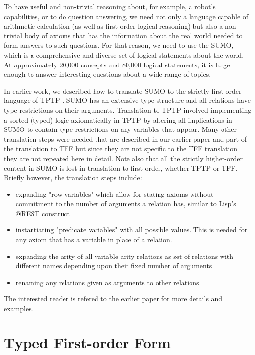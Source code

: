 \documentclass{article}
\begin{document}
To have useful and non-trivial reasoning about, for example, a robot's
capabilities, or to do question answering, we need not only a language capable of
arithmetic calculation (as well as first order logical reasoning) but also a
non-trivial body of axioms that has the information about the real world needed
to form answers to such questions.  For that reason, we need to use the SUMO,
which is a comprehensive and diverse set of logical statements about the world.
At approximately 20,000 concepts and 80,000 logical statements, it is large
enough to answer interesting questions about a wide range of topics.

In earlier work, we described \citep{ps14} how to translate SUMO to the strictly
first order language of TPTP \citep{Sutcliffe:2007:TTC:2391910.2391914}.  SUMO
has an extensive type structure and all relations have type restrictions on
their arguments.  Translation to TPTP involved implementing a sorted (typed)
logic axiomatically in TPTP by altering all implications in SUMO to contain type
restrictions on any variables that appear.  Many other translation steps were
needed that are described in our earlier paper and part of the translation to
TFF but since they are not specific to the TFF translation they are not repeated
here in detail. Note also that all the strictly higher-order content in SUMO is
lost in translation to first-order, whether TPTP or TFF. Briefly however, the 
translation steps include:

\begin{itemize}
\item expanding "row variables" which allow for stating axioms without commitment
to the number of arguments a relation has, similar to Lisp's @REST construct
\item instantiating "predicate variables" with all possible values.  This is needed
for any axiom that has a variable in place of a relation.
\item expanding the arity of all variable arity relations as set of relations with
different names depending upon their fixed number of arguments
\item renaming any relations given as arguments to other relations
\end{itemize}

The interested reader is refered to the earlier paper for more details and examples.

\section{Typed First-order Form}
\end{document}
